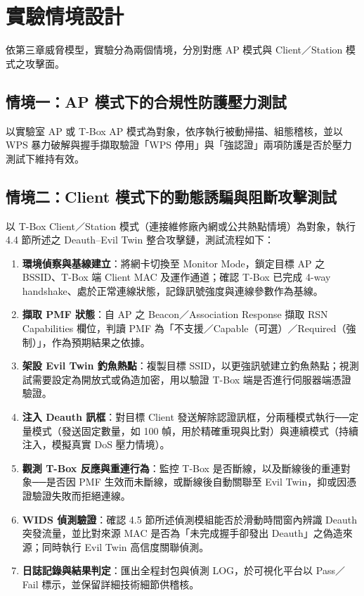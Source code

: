 \documentclass[12pt,a4paper,oneside]{report}
\begin{document}
\section{實驗情境設計}
依第三章威脅模型，實驗分為兩個情境，分別對應 AP 模式與 Client／Station 模式之攻擊面。

\subsection{情境一：AP 模式下的合規性防護壓力測試}
以實驗室 AP 或 T-Box AP 模式為對象，依序執行被動掃描、組態稽核，並以 WPS 暴力破解與握手擷取驗證「WPS 停用」與「強認證」兩項防護是否於壓力測試下維持有效。

\subsection{情境二：Client 模式下的動態誘騙與阻斷攻擊測試}
以 T-Box Client／Station 模式（連接維修廠內網或公共熱點情境）為對象，執行 4.4 節所述之 Deauth–Evil Twin 整合攻擊鏈，測試流程如下：

\begin{enumerate}
  \item[\textbf{Step 1}] \textbf{環境偵察與基線建立}：將網卡切換至 Monitor Mode，鎖定目標 AP 之 BSSID、T-Box 端 Client MAC 及運作通道；確認 T-Box 已完成 4-way handshake、處於正常連線狀態，記錄訊號強度與連線參數作為基線。
  \item[\textbf{Step 2}] \textbf{擷取 PMF 狀態}：自 AP 之 Beacon／Association Response 擷取 RSN Capabilities 欄位，判讀 PMF 為「不支援／Capable（可選）／Required（強制）」，作為預期結果之依據。
  \item[\textbf{Step 3}] \textbf{架設 Evil Twin 釣魚熱點}：複製目標 SSID，以更強訊號建立釣魚熱點；視測試需要設定為開放式或偽造加密，用以驗證 T-Box 端是否進行伺服器端憑證驗證。
  \item[\textbf{Step 4}] \textbf{注入 Deauth 訊框}：對目標 Client 發送解除認證訊框，分兩種模式執行──定量模式（發送固定數量，如 100 幀，用於精確重現與比對）與連續模式（持續注入，模擬真實 DoS 壓力情境）。
  \item[\textbf{Step 5}] \textbf{觀測 T-Box 反應與重連行為}：監控 T-Box 是否斷線，以及斷線後的重連對象──是否因 PMF 生效而未斷線，或斷線後自動關聯至 Evil Twin，抑或因憑證驗證失敗而拒絕連線。
  \item[\textbf{Step 6}] \textbf{WIDS 偵測驗證}：確認 4.5 節所述偵測模組能否於滑動時間窗內辨識 Deauth 突發流量，並比對來源 MAC 是否為「未完成握手卻發出 Deauth」之偽造來源；同時執行 Evil Twin 高信度關聯偵測。
  \item[\textbf{Step 7}] \textbf{日誌記錄與結果判定}：匯出全程封包與偵測 LOG，於可視化平台以 Pass／Fail 標示，並保留詳細技術細節供稽核。
\end{enumerate}
\end{document}
